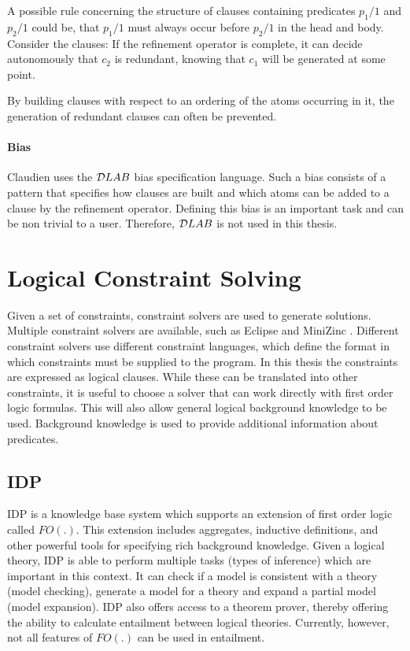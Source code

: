 \begin{example}
A possible rule concerning the structure of clauses containing predicates $p_1/1$ and $p_2/1$ could be, that $p_1/1$ must always occur before $p_2/1$ in the head and body.
Consider the clauses:
If the refinement operator is complete, it can decide autonomously that $c_2$ is redundant, knowing that $c_1$ will be generated at some point.
\end{example}

By building clauses with respect to an ordering of the atoms occurring in it, the generation of redundant clauses can often be prevented.

\paragraph{Bias}
Claudien uses the $\mathcal{D}LAB$ bias specification language.
Such a bias consists of a pattern that specifies how clauses are built and which atoms can be added to a clause by the refinement operator.
Defining this bias is an important task and can be non trivial to a user.
Therefore, $\mathcal{D}LAB$ is not used in this thesis.

\section{Logical Constraint Solving}
\label{sec:logical_constraint_solving}
Given a set of constraints, constraint solvers are used to generate solutions.
Multiple constraint solvers are available, such as Eclipse \cite{apt2006constraint} and MiniZinc \cite{nethercote2007minizinc}.
Different constraint solvers use different constraint languages, which define the format in which constraints must be supplied to the program.
In this thesis the constraints are expressed as logical clauses.
While these can be translated into other constraints, it is useful to choose a solver that can work directly with first order logic formulas.
This will also allow general logical background knowledge to be used.
Background knowledge is used to provide additional information about predicates.

\subsection{IDP}
IDP \cite{de2013prototype,wittocx2008idp} is a knowledge base system which supports an extension of first order logic called $FO(.)$.
This extension includes aggregates, inductive definitions, and other powerful tools for specifying rich background knowledge.
Given a logical theory, IDP is able to perform multiple tasks (types of inference) which are important in this context.
It can check if a model is consistent with a theory (model checking), generate a model for a theory and expand a partial model (model expansion).
IDP also offers access to a theorem prover, thereby offering the ability to calculate entailment between logical theories.
Currently, however, not all features of $FO(.)$ can be used in entailment.


